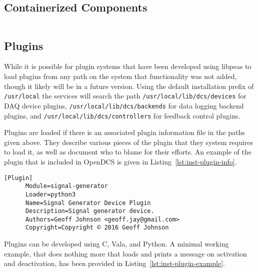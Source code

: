  \subsection{Containerized Components}\label{sec:inst-cont}

    \begin{lstlisting}[caption={Building Containers},
                       label={lst:inst-cont}]
    \end{lstlisting}

  \subsection{Plugins}\label{sec:inst-plugins}

    While it is possible for plugin systems that have been developed using
    libpeas to load plugins from any path on the system that functionality was
    not added, though it likely will be in a future version. Using the default
    installation prefix of \texttt{/usr/local} the services will search the
    path \texttt{/usr/local/lib/dcs/devices} for DAQ device plugins,
    \texttt{/usr/local/lib/dcs/backends} for data logging backend plugins,
    and \texttt{/usr/local/lib/dcs/controllers} for feedback control plugins.

    Plugins are loaded if there is an associated plugin information file in the
    paths given above. They describe various pieces of the plugin that they
    system requires to load it, as well as document who to blame for their
    efforts. An example of the plugin that is included in OpenDCS is given in
    Listing~\ref{lst:inst-plugin-info}.

    \begin{lstlisting}[caption={Plugin Information File Example},
                       label={lst:inst-plugin-info}]
      [Plugin]
      Module=signal-generator
      Loader=python3
      Name=Signal Generator Device Plugin
      Description=Signal generator device.
      Authors=Geoff Johnson <geoff.jay@gmail.com>
      Copyright=Copyright © 2016 Geoff Johnson
    \end{lstlisting}

    Plugins can be developed using C, Vala, and Python. A minimal working
    example, that does nothing more that loads and prints a message on
    activation and deactivation, has been provided in
    Listing~\ref{lst:inst-plugin-example}.

